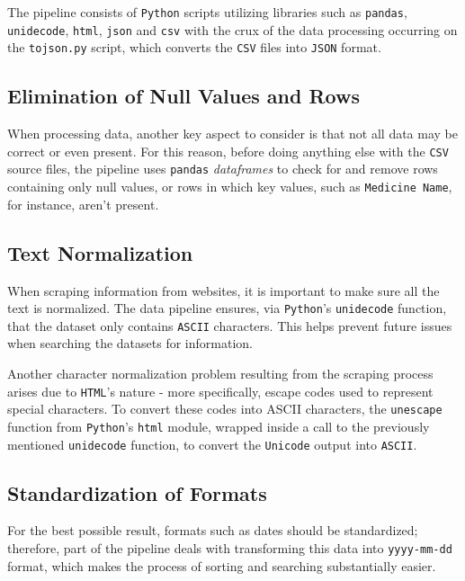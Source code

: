 \documentclass[sigconf]{acmart}
\begin{document}
The pipeline consists of \texttt{Python}\cite{python} scripts utilizing libraries such as \texttt{pandas}\cite{pandas}, \texttt{unidecode}\cite{unidecode}, \texttt{html}\cite{html}, \texttt{json}\cite{json} and \texttt{csv}\cite{csv} with the crux of the data processing occurring on the \texttt{to{\textunderscore}json.py} script, which converts the \texttt{CSV} files into \texttt{JSON} format.

\subsection{Elimination of Null Values and Rows}

When processing data, another key aspect to consider is that not all data may be correct or even present. For this reason, before doing anything else with the \texttt{CSV} source files, the pipeline uses \texttt{pandas} \textit{dataframes} to check for and remove rows containing only null values, or rows in which key values, such as \texttt{Medicine Name}, for instance, aren't present.

\subsection{Text Normalization}

When scraping information from websites, it is important to make sure all the text is normalized. The data pipeline ensures, via \texttt{Python}'s \texttt{unidecode} function, that the dataset only contains \texttt{ASCII} characters. This helps prevent future issues when searching the datasets for information.

Another character normalization problem resulting from the scraping process arises due to \texttt{HTML}'s nature - more specifically, escape codes used to represent special characters. To convert these codes into ASCII characters, the \texttt{unescape}\cite{html} function from \texttt{Python}'s \texttt{html} module, wrapped inside a call to the previously mentioned \texttt{unidecode} function, to convert the \texttt{Unicode} output into \texttt{ASCII}.

\subsection{Standardization of Formats}

For the best possible result, formats such as dates should be standardized; therefore, part of the pipeline deals with transforming this data into \texttt{yyyy-mm-dd} format, which makes the process of sorting and searching substantially easier.
\end{document}

